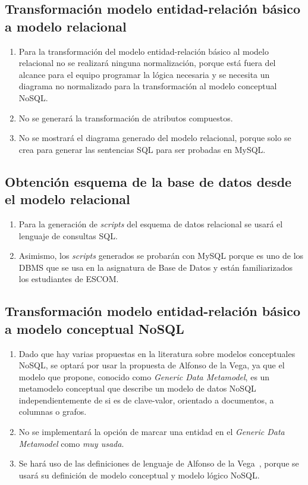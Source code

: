\subsection*{Transformación modelo entidad-relación básico a modelo relacional}
\begin{enumerate}
    \item Para la transformación del modelo entidad-relación básico al modelo relacional no se realizará ninguna normalización, porque está fuera del alcance para el equipo programar la lógica necesaria y se necesita un diagrama no normalizado para la transformación al modelo conceptual NoSQL.
    \item No se generará la transformación de atributos compuestos.
    \item No se mostrará el diagrama generado del modelo relacional, porque solo se crea para generar las sentencias SQL para ser probadas en MySQL.
\end{enumerate}

\subsection*{Obtención esquema de la base de datos desde el modelo relacional}
\begin{enumerate}
    \item Para la generación de \textit{scripts} del esquema de datos relacional se usará el lenguaje de consultas SQL.
    \item Asimismo, los \textit{scripts} generados se probarán con MySQL porque es uno de los DBMS que se usa en la asignatura de Base de Datos y están familiarizados los estudiantes de ESCOM.
\end{enumerate}

\subsection*{Transformación modelo entidad-relación básico a modelo conceptual NoSQL}
\begin{enumerate}
    \item Dado que hay varias propuestas en la literatura sobre modelos conceptuales NoSQL, se optará por usar la propuesta de Alfonso de la Vega\cite{de_la_vega_mortadelo_2020}, ya que el modelo que propone, conocido como \textit{Generic Data Metamodel}, es un metamodelo conceptual que describe un modelo de datos NoSQL independientemente de si es de clave-valor, orientado a documentos, a columnas o grafos.
    \item No se implementará la opción de marcar una entidad en el \textit{Generic Data Metamodel} como \textit{muy usada}.
    \item Se hará uso de las definiciones de lenguaje de Alfonso de la Vega~\cite{de_la_vega_mortadelo_2020}, porque se usará su definición de modelo conceptual y modelo lógico NoSQL.
\end{enumerate}

